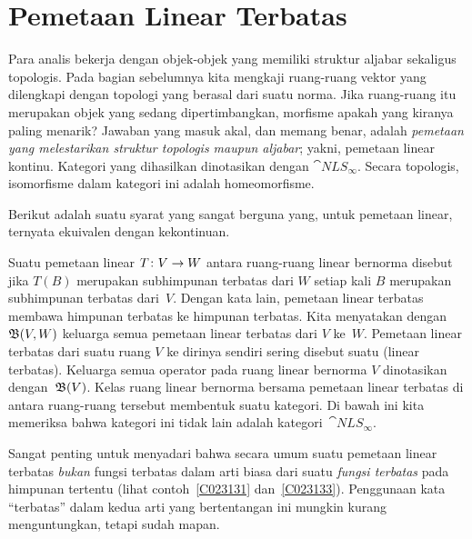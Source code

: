 \section{Pemetaan Linear Terbatas}\label{sec_bdd_lin_maps}
Para analis bekerja dengan objek-objek yang memiliki struktur aljabar sekaligus topologis.
Pada bagian sebelumnya kita mengkaji ruang-ruang vektor yang dilengkapi dengan topologi
yang berasal dari suatu norma. Jika ruang-ruang itu merupakan objek yang sedang
dipertimbangkan, morfisme apakah yang kiranya paling menarik? Jawaban yang masuk akal,
dan memang benar, adalah \emph{pemetaan yang melestarikan struktur topologis maupun
aljabar}; yakni, pemetaan linear kontinu. Kategori yang dihasilkan dinotasikan dengan
$\cat{NLS_{\boldsymbol\infty}}$. Secara topologis, isomorfisme dalam kategori ini adalah
homeomorfisme.

Berikut adalah suatu syarat yang sangat berguna yang, untuk pemetaan linear, ternyata
ekuivalen dengan kekontinuan.

\begin{defn} Suatu pemetaan linear $T\colon V \rightarrow W$ antara ruang-ruang linear bernorma
disebut
 jika $T(B)$ merupakan subhimpunan terbatas dari $W$ setiap kali $B$
merupakan subhimpunan terbatas dari~$V$. Dengan kata lain, pemetaan linear terbatas
membawa himpunan terbatas ke himpunan terbatas. Kita menyatakan
dengan~$\mathfrak{B}(V,W)$ keluarga semua pemetaan linear terbatas dari $V$ ke~$W$. Pemetaan
linear terbatas dari suatu ruang $V$ ke dirinya sendiri sering disebut suatu
 (linear terbatas). Keluarga semua operator pada ruang linear bernorma $V$
dinotasikan
dengan~$\mathfrak{B}(V)$. Kelas ruang linear bernorma bersama pemetaan linear terbatas di antara
ruang-ruang tersebut membentuk suatu kategori. Di bawah ini kita memeriksa bahwa kategori
ini tidak lain adalah kategori~$\cat{NLS_{\boldsymbol\infty}}$.
\end{defn}

\begin{cau} Sangat penting untuk menyadari bahwa secara umum suatu pemetaan linear
terbatas \emph{bukan} fungsi terbatas dalam arti biasa dari suatu \emph{fungsi terbatas}
pada himpunan tertentu (lihat contoh~\ref{C023131} dan~\ref{C023133}). Penggunaan kata
``terbatas'' dalam kedua arti yang bertentangan ini mungkin kurang menguntungkan, tetapi
sudah mapan.
\end{cau}

